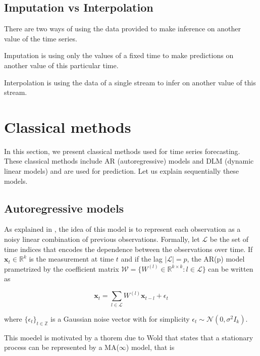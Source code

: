 \documentclass{article}
\begin{document}
\subsection*{Imputation vs Interpolation}
There are two ways of using the data provided to make inference on another value of the time series.
\begin{definition}{Imputation}
is using only the values of a fixed time to make predictions on another value of this particular time.
\end{definition}
\begin{definition}{Interpolation}
 is using the data of a single stream to infer on another value of this stream.
\end{definition}

\section{Classical methods}
In this section, we present classical methods used for time series forecasting.
These classical methods include AR (autoregressive) models and DLM (dynamic linear models) and are used for prediction.
Let us explain sequentially these models.

\subsection*{Autoregressive models}
As explained in \cite{pmlr-v37-anava15}, the idea of this model is to represent each observation as a noisy linear combination of previous observations.
Formally, let $\mathcal{L}$ be the set of time indices that encodes the dependence between the observations over time. If $\mathbf{x}_t \in \mathbb{R}^k$ is the measurement at time $t$ and if the lag $|\mathcal{L}| = p$, the AR(p) model prametrized by the coefficient matrix $\mathcal{W} = \{W^{(l)} \in \mathbb{R}^{k \times k} : l \in \mathcal{L} \}$ can be written as

\begin{equation}
\mathbf{x}_t = \sum_{l \in \mathcal{L}} W^{(l)} \mathbf{x}_{t-l} + \epsilon_t
\label{eq:ar}
\end{equation}

where $\{ \epsilon_t \}_{t \in \mathbb{Z}}$ is a Gaussian noise vector with for simplicity $\epsilon_t \sim \mathcal{N}(0, \sigma^2 I_k)$.

This moedel is motivated by a thorem due to Wold that states that a stationary process can be represented by a MA($\infty$) model, that is
\end{document}

